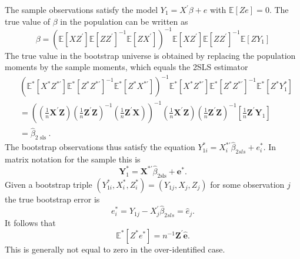 \documentclass[10pt]{article}
\begin{document}
The sample observations satisfy the model $Y_{1}=X^{\prime} \beta+e$ with $\mathbb{E}[Z e]=0$. The true value of $\beta$ in the population can be written as
$$
\beta=\left(\mathbb{E}\left[X Z^{\prime}\right] \mathbb{E}\left[Z Z^{\prime}\right]^{-1} \mathbb{E}\left[Z X^{\prime}\right]\right)^{-1} \mathbb{E}\left[X Z^{\prime}\right] \mathbb{E}\left[Z Z^{\prime}\right]^{-1} \mathbb{E}\left[Z Y_{1}\right]
$$
The true value in the bootstrap universe is obtained by replacing the population moments by the sample moments, which equals the 2SLS estimator
$$
\begin{aligned}
&\left(\mathbb{E}^{*}\left[X^{*} Z^{* \prime}\right] \mathbb{E}^{*}\left[Z^{*} Z^{* \prime}\right]^{-1} \mathbb{E}^{*}\left[Z^{*} X^{* \prime}\right]\right)^{-1} \mathbb{E}^{*}\left[X^{*} Z^{* \prime}\right] \mathbb{E}^{*}\left[Z^{*} Z^{* \prime}\right]^{-1} \mathbb{E}^{*}\left[Z^{*} Y_{1}^{*}\right] \\
&=\left(\left(\frac{1}{n} \boldsymbol{X}^{\prime} \boldsymbol{Z}\right)\left(\frac{1}{n} \boldsymbol{Z}^{\prime} \boldsymbol{Z}\right)^{-1}\left(\frac{1}{n} \boldsymbol{Z}^{\prime} \boldsymbol{X}\right)\right)^{-1}\left(\frac{1}{n} \boldsymbol{X}^{\prime} \boldsymbol{Z}\right)\left(\frac{1}{n} \boldsymbol{Z}^{\prime} \boldsymbol{Z}\right)^{-1}\left[\frac{1}{n} \boldsymbol{Z}^{\prime} \boldsymbol{Y}_{1}\right] \\
&=\widehat{\beta}_{2 \text { sls }} .
\end{aligned}
$$
The bootstrap observations thus satisfy the equation $Y_{1 i}^{*}=X_{i}^{* \prime} \widehat{\beta}_{2 s l s}+e_{i}^{*}$. In matrix notation for the sample this is
$$
\boldsymbol{Y}_{1}^{*}=\boldsymbol{X}^{* \prime} \widehat{\beta}_{2 \mathrm{sls}}+\boldsymbol{e}^{*} .
$$
Given a bootstrap triple $\left(Y_{1 i}^{*}, X_{i}^{*}, Z_{i}^{*}\right)=\left(Y_{1 j}, X_{j}, Z_{j}\right)$ for some observation $j$ the true bootstrap error is
$$
e_{i}^{*}=Y_{1 j}-X_{j}^{\prime} \widehat{\beta}_{2 s l s}=\widehat{e}_{j} .
$$
It follows that
$$
\mathbb{E}^{*}\left[Z^{*} e^{*}\right]=n^{-1} \boldsymbol{Z}^{\prime} \widehat{\boldsymbol{e}} .
$$
This is generally not equal to zero in the over-identified case.
\end{document}
